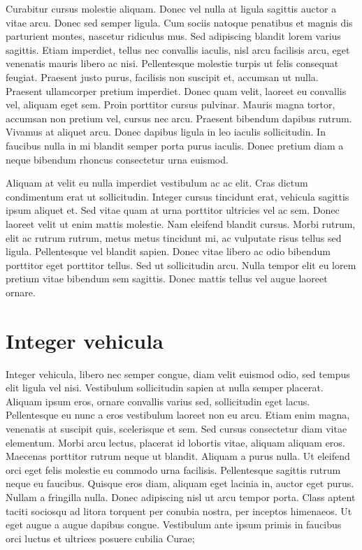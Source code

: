 Curabitur cursus molestie aliquam.
Donec vel nulla at ligula sagittis auctor a vitae arcu.
Donec sed semper ligula.
Cum sociis natoque penatibus et magnis dis parturient montes, nascetur ridiculus mus.
Sed adipiscing blandit lorem varius sagittis.
Etiam imperdiet, tellus nec convallis iaculis, nisl arcu facilisis arcu, eget venenatis mauris libero ac nisi.
Pellentesque molestie turpis ut felis consequat feugiat.
Praesent justo purus, facilisis non suscipit et, accumsan ut nulla.
Praesent ullamcorper pretium imperdiet.
Donec quam velit, laoreet eu convallis vel, aliquam eget sem.
Proin porttitor cursus pulvinar.
Mauris magna tortor, accumsan non pretium vel, cursus nec arcu.
Praesent bibendum dapibus rutrum.
Vivamus at aliquet arcu.
Donec dapibus ligula in leo iaculis sollicitudin.
In faucibus nulla in mi blandit semper porta purus iaculis.
Donec pretium diam a neque bibendum rhoncus consectetur urna euismod.

Aliquam at velit eu nulla imperdiet vestibulum ac ac elit.
Cras dictum condimentum erat ut sollicitudin.
Integer cursus tincidunt erat, vehicula sagittis ipsum aliquet et.
Sed vitae quam at urna porttitor ultricies vel ac sem.
Donec laoreet velit ut enim mattis molestie.
Nam eleifend blandit cursus.
Morbi rutrum, elit ac rutrum rutrum, metus metus tincidunt mi, ac vulputate risus tellus sed ligula.
Pellentesque vel blandit sapien.
Donec vitae libero ac odio bibendum porttitor eget porttitor tellus.
Sed ut sollicitudin arcu.
Nulla tempor elit eu lorem pretium vitae bibendum sem sagittis.
Donec mattis tellus vel augue laoreet ornare.

\section{Integer vehicula}
Integer vehicula, libero nec semper congue, diam velit euismod odio, sed tempus elit ligula vel nisi.
Vestibulum sollicitudin sapien at nulla semper placerat.
Aliquam ipsum eros, ornare convallis varius sed, sollicitudin eget lacus.
Pellentesque eu nunc a eros vestibulum laoreet non eu arcu.
Etiam enim magna, venenatis at suscipit quis, scelerisque et sem.
Sed cursus consectetur diam vitae elementum.
Morbi arcu lectus, placerat id lobortis vitae, aliquam aliquam eros.
Maecenas porttitor rutrum neque ut blandit.
Aliquam a purus nulla.
Ut eleifend orci eget felis molestie eu commodo urna facilisis.
Pellentesque sagittis rutrum neque eu faucibus.
Quisque eros diam, aliquam eget lacinia in, auctor eget purus.
Nullam a fringilla nulla.
Donec adipiscing nisl ut arcu tempor porta.
Class aptent taciti sociosqu ad litora torquent per conubia nostra, per inceptos himenaeos.
Ut eget augue a augue dapibus congue.
Vestibulum ante ipsum primis in faucibus orci luctus et ultrices posuere cubilia Curae;

